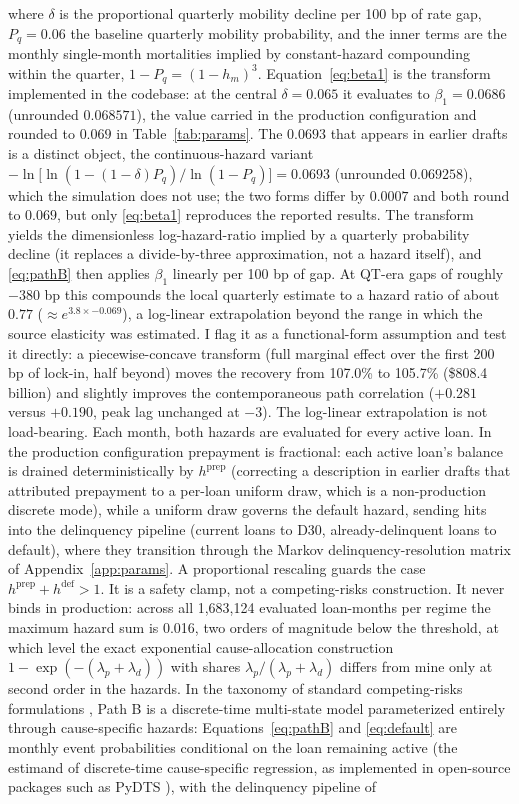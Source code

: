 \documentclass[12pt]{article}
\begin{document}
where $\delta$ is the proportional quarterly mobility decline per 100 bp of rate gap, $P_q = 0.06$ the baseline quarterly mobility probability, and the inner terms are the monthly single-month mortalities implied by constant-hazard compounding within the quarter, $1 - P_q = (1 - h_m)^3$. Equation~\eqref{eq:beta1} is the transform implemented in the codebase: at the central $\delta = 0.065$ it evaluates to $\beta_1 = 0.0686$ (unrounded $0.068571$), the value carried in the production configuration and rounded to $0.069$ in Table~\ref{tab:params}. The $0.0693$ that appears in earlier drafts is a distinct object, the continuous-hazard variant $-\ln\!\big[\ln(1-(1-\delta)P_q)/\ln(1-P_q)\big] = 0.0693$ (unrounded $0.069258$), which the simulation does not use; the two forms differ by $0.0007$ and both round to $0.069$, but only \eqref{eq:beta1} reproduces the reported results. The transform yields the dimensionless log-hazard-ratio implied by a quarterly probability decline (it replaces a divide-by-three approximation, not a hazard itself), and \eqref{eq:pathB} then applies $\beta_1$ linearly per 100 bp of gap. At QT-era gaps of roughly $-380$ bp this compounds the local quarterly estimate to a hazard ratio of about $0.77$ ($\approx e^{3.8 \times -0.069}$), a log-linear extrapolation beyond the range in which the source elasticity was estimated. I flag it as a functional-form assumption and test it directly: a piecewise-concave transform (full marginal effect over the first 200 bp of lock-in, half beyond) moves the recovery from 107.0\% to 105.7\% (\$808.4 billion) and slightly improves the contemporaneous path correlation ($+0.281$ versus $+0.190$, peak lag unchanged at $-3$). The log-linear extrapolation is not load-bearing. Each month, both hazards are evaluated for every active loan. In the production configuration prepayment is fractional: each active loan's balance is drained deterministically by $h^{\mathrm{prep}}$ (correcting a description in earlier drafts that attributed prepayment to a per-loan uniform draw, which is a non-production discrete mode), while a uniform draw governs the default hazard, sending hits into the delinquency pipeline (current loans to D30, already-delinquent loans to default), where they transition through the Markov delinquency-resolution matrix of Appendix~\ref{app:params}. A proportional rescaling guards the case $h^{\mathrm{prep}} + h^{\mathrm{def}} > 1$. It is a safety clamp, not a competing-risks construction. It never binds in production: across all 1,683,124 evaluated loan-months per regime the maximum hazard sum is 0.016, two orders of magnitude below the threshold, at which level the exact exponential cause-allocation construction $1-\exp(-(\lambda_p+\lambda_d))$ with shares $\lambda_p/(\lambda_p+\lambda_d)$ differs from mine only at second order in the hazards. In the taxonomy of standard competing-risks formulations \citep{putter2007}, Path B is a discrete-time multi-state model parameterized entirely through cause-specific hazards: Equations~\eqref{eq:pathB} and \eqref{eq:default} are monthly event probabilities conditional on the loan remaining active (the estimand of discrete-time cause-specific regression, as implemented in open-source packages such as PyDTS \citep{meir2025}), with the delinquency pipeline of 
\end{document}
